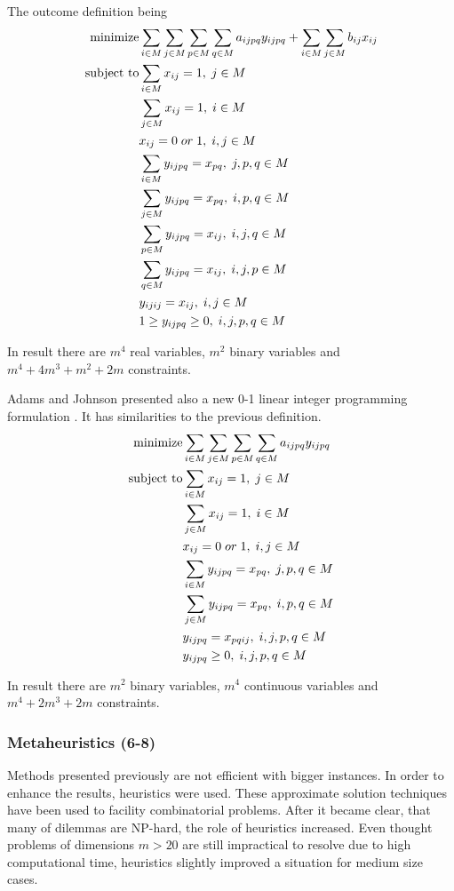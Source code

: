 The outcome definition being
\begin{align}
  \text{minimize} &\null \sum_{i \in M} \sum_{j \in M} \sum_{p \in M} \sum_{q \in M} a_{ijpq}y_{ijpq} + \sum_{i \in M} \sum_{j \in M} b_{ij} x_{ij} \\
  \text{subject to} &\null \sum_{i \in M} x_{ij} = 1, \; j \in M \\
  &\null \sum_{j \in M} x_{ij} = 1, \; i \in M \\
  &\null x_{ij} = 0 \; or \; 1, \; i, j \in M \\
  &\null \sum_{i \in M} y_{ijpq} = x_{pq}, \; j, p, q \in M \\
  &\null \sum_{j \in M} y_{ijpq} = x_{pq}, \; i, p, q \in M \\
  &\null \sum_{p \in M} y_{ijpq} = x_{ij}, \; i, j, q \in M \\
  &\null \sum_{q \in M} y_{ijpq}= x_{ij}, \; i, j, p \in M \\
  &\null y_{ijij} = x_{ij}, \; i, j \in M \\
  &\null 1 \geq y_{ijpq} \geq 0, \; i, j, p, q \in M
\end{align}

In result there are $m^4$ real variables, $m^2$ binary variables and $m^4 + 4m^3+m^2+2m$ constraints.

Adams and Johnson presented also a new 0-1 linear integer programming formulation \cite{adams1994improved}.
It has similarities to the previous definition.
\begin{align}
  \text{minimize} &\null \sum_{i \in M} \sum_{j \in M} \sum_{p \in M} \sum_{q \in M} a_{ijpq}y_{ijpq} \\
  \text{subject to} &\null \sum_{i \in M} x_{ij} = 1, \; j \in M \\
  &\null \sum_{j \in M} x_{ij} = 1, \; i \in M \\
  &\null x_{ij} = 0 \; or \; 1, \; i, j \in M \\
  &\null \sum_{i \in M} y_{ijpq} = x_{pq}, \; j, p, q \in M \\
  &\null \sum_{j \in M} y_{ijpq} = x_{pq}, \; i, p, q \in M \\
  &\null y_{ijpq} = x_{pqij}, \; i, j, p, q \in M \\
  &\null y_{ijpq} \geq 0, \; i, j, p, q \in M
\end{align}

In result there are $m^2$ binary variables, $m^4$ continuous variables and $m^4+2m^3+2m$ constraints.

\subsubsection{Metaheuristics (6-8)}
Methods presented previously are not efficient with bigger instances.
In order to enhance the results, heuristics were used.
These approximate solution techniques have been used to facility combinatorial problems.
After it became clear, that many of dilemmas are NP-hard, the role of heuristics increased.
Even thought problems of dimensions $m > 20$ are still impractical to resolve due to high computational time, heuristics slightly improved a situation for medium size cases.

